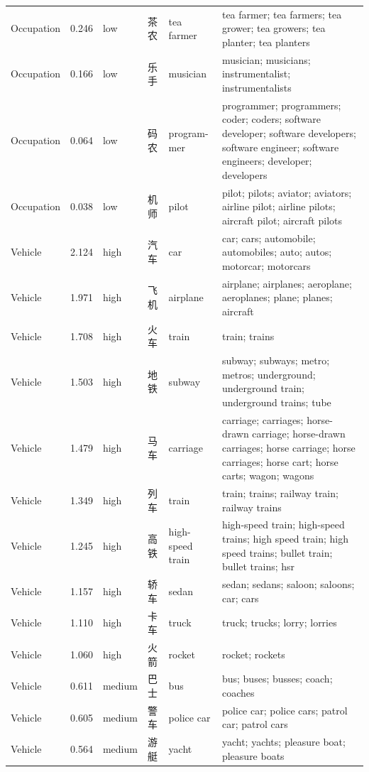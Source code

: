 {\begin{longtable}[c]{@{}>{\raggedright\arraybackslash}p{1.85cm}l l l>{\raggedright\arraybackslash}p{1.85cm}>{\raggedright\arraybackslash}p{8.10cm}@{}}
Occupation & 0.246 & low & 茶农 & tea farmer & tea farmer; tea farmers; tea grower; tea growers; tea planter; tea planters \\
Occupation & 0.166 & low & 乐手 & musician & musician; musicians; instrumentalist; instrumentalists \\
Occupation & 0.064 & low & 码农 & program-\newline mer & programmer; programmers; coder; coders; software developer; software developers; software engineer; software engineers; developer; developers \\
Occupation & 0.038 & low & 机师 & pilot & pilot; pilots; aviator; aviators; airline pilot; airline pilots; aircraft pilot; aircraft pilots \\
Vehicle & 2.124 & high & 汽车 & car & car; cars; automobile; automobiles; auto; autos; motorcar; motorcars \\
Vehicle & 1.971 & high & 飞机 & airplane & airplane; airplanes; aeroplane; aeroplanes; plane; planes; aircraft \\
Vehicle & 1.708 & high & 火车 & train & train; trains \\
Vehicle & 1.503 & high & 地铁 & subway & subway; subways; metro; metros; underground; underground train; underground trains; tube \\
Vehicle & 1.479 & high & 马车 & carriage & carriage; carriages; horse-drawn carriage; horse-drawn carriages; horse carriage; horse carriages; horse cart; horse carts; wagon; wagons \\
Vehicle & 1.349 & high & 列车 & train & train; trains; railway train; railway trains \\
Vehicle & 1.245 & high & 高铁 & high-speed train & high-speed train; high-speed trains; high speed train; high speed trains; bullet train; bullet trains; hsr \\
Vehicle & 1.157 & high & 轿车 & sedan & sedan; sedans; saloon; saloons; car; cars \\
Vehicle & 1.110 & high & 卡车 & truck & truck; trucks; lorry; lorries \\
Vehicle & 1.060 & high & 火箭 & rocket & rocket; rockets \\
Vehicle & 0.611 & medium & 巴士 & bus & bus; buses; busses; coach; coaches \\
Vehicle & 0.605 & medium & 警车 & police car & police car; police cars; patrol car; patrol cars \\
Vehicle & 0.564 & medium & 游艇 & yacht & yacht; yachts; pleasure boat; pleasure boats \\

\end{longtable}}
